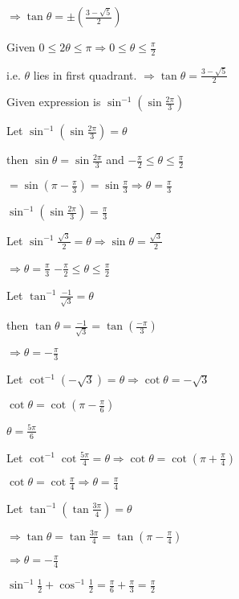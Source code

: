   $\Rightarrow \tan\theta = \pm\left(\frac{3 - \sqrt{5}}{2}\right)$

  Given $0 \leq 2\theta \leq \pi \Rightarrow 0\leq \theta \leq \frac{\pi}{2}$

  i.e. $\theta$ lies in first quadrant. $\Rightarrow \tan\theta = \frac{3 - \sqrt{5}}{2}$

\item Given expression is $\sin^{-1}\left(\sin\frac{2\pi}{3}\right)$

  Let $\sin^{-1}\left(\sin\frac{2\pi}{3}\right) = \theta$

  then $\sin\theta = \sin\frac{2\pi}{3}$ and $-\frac{\pi}{2}\leq\theta\leq \frac{\pi}{2}$

  $=\sin\left(\pi - \frac{\pi}{3}\right) = \sin\frac{\pi}{3} \Rightarrow \theta = \frac{\pi}{3}$

  $\sin^{-1}\left(\sin\frac{2\pi}{3}\right) = \frac{\pi}{3}$

\item Let $\sin^{-1}\frac{\sqrt{3}}{2} = \theta \Rightarrow \sin\theta = \frac{\sqrt{3}}{2}$

  $\Rightarrow \theta = \frac{\pi}{3}$ $-\frac{\pi}{2}\leq\theta\leq \frac{\pi}{2}$

\item Let $\tan^{-1}\frac{-1}{\sqrt{3}} =\theta$

  then $\tan\theta = \frac{-1}{\sqrt{3}} =\tan\left(\frac{-\pi}{3}\right)$

  $\Rightarrow \theta = -\frac{\pi}{3}$

\item Let $\cot^{-1}(-\sqrt{3}) = \theta \Rightarrow \cot\theta = -\sqrt{3}$

  $\cot\theta = \cot\left(\pi - \frac{\pi}{6}\right)$

  $\theta = \frac{5\pi}{6}$

\item Let $\cot^{-1}\cot\frac{5\pi}{4} = \theta \Rightarrow \cot\theta = \cot\left(\pi + \frac{\pi}{4}\right)$

  $\cot\theta = \cot\frac{\pi}{4} \Rightarrow \theta = \frac{\pi}{4}$

\item Let $\tan^{-1}\left(\tan\frac{3\pi}{4}\right) = \theta$

  $\Rightarrow \tan\theta = \tan\frac{3\pi}{4} = \tan\left(\pi - \frac{\pi}{4}\right)$

  $\Rightarrow \theta = -\frac{\pi}{4}$

\item $\sin^{-1}\frac{1}{2} + \cos^{-1}\frac{1}{2} = \frac{\pi}{6} + \frac{\pi}{3} = \frac{\pi}{2}$

